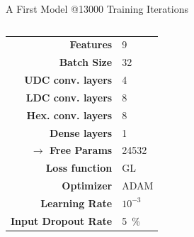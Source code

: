 \begin{frame}{A First Model @13000 Training Iterations}
    \begin{columns}
        \begin{column}{.35\textwidth}
            \begin{tabular}{>{\small\bf}r l}
                \toprule
                Features                  & 9                \\
                Batch Size                & 32               \\
                UDC conv. layers          & 4                \\
                LDC conv. layers          & 8                \\
                Hex. conv. layers         & 8                \\
                Dense layers              & 1\times50        \\
                $\rightarrow$ Free Params & 24532            \\
                \midrule
                Loss function             & GL               \\
                Optimizer                 & ADAM             \\
                Learning Rate             & $10^{-3}$        \\
                Input Dropout Rate        & \SI{5}{\percent} \\
                \bottomrule
            \end{tabular}
        \end{column}
        \begin{column}{.65\textwidth}
            \begin{figure}
                \centering
\end{figure}
\end{column}
\end{columns}
\end{frame}
